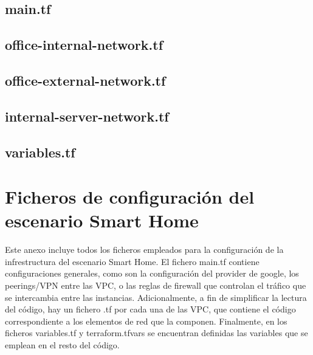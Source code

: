\section*{main.tf} 


\section*{office-internal-network.tf}


\section*{office-external-network.tf}

\clearpage

\section*{internal-server-network.tf}

\clearpage

\section*{variables.tf}


\chapter{Ficheros de configuración del escenario Smart Home} \label{anx:sh}
  Este anexo incluye todos los ficheros empleados para la configuración de la infrestructura del escenario Smart Home. El fichero main.tf contiene configuraciones generales, como son la configuración del provider de google, los peerings/VPN entre las VPC, o las reglas de firewall que controlan el tráfico que se intercambia entre las instancias. Adicionalmente, a fin de simplificar la lectura del código, hay un fichero .tf por cada una de las VPC, que contiene el código correspondiente a los elementos de red que la componen. Finalmente, en los ficheros variables.tf y terraform.tfvars se encuentran definidas las variables que se emplean en el resto del código.

